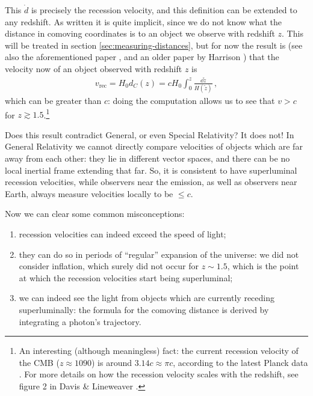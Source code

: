 \documentclass[main.tex]{subfiles}
\begin{document}
This \(\dot{d}\) is precisely the recession velocity, and this definition can be extended to any redshift. As written it is quite implicit, since we do not know what the distance in comoving coordinates is to an object we observe with redshift \(z\). This will be treated in section \ref{sec:measuring-distances}, but for now the result is (see also the aforementioned paper \cite[eq. 1]{davisExpandingConfusionCommon2004}, and an older paper by Harrison \cite[eq. 13]{harrisonRedshiftdistanceVelocitydistanceLaws1993}) that the velocity now of an object observed with redshift \(z\) is
%
\begin{align}
v _{\text{rec}} = H_0 d_C(z) = c H_0  \int_{0}^{z} \frac{ \dd{\widetilde{z}}}{H(\widetilde{z})}
\,,
\end{align}
%
which can be greater than \(c\): doing the computation allows us to see that \(v>c\) for \(z \gtrsim 1.5\).\footnote{An interesting (although meaningless) fact: the current recession velocity of the CMB (\(z \approx 1090\)) is around \(\num{3.14} c \approx \pi c\), according to the latest Planck data \cite[]{adePlanck2015Results2016}. For more details on how the recession velocity scales with the redshift, see figure 2 in Davis \& Lineweaver \cite[]{davisExpandingConfusionCommon2004}.} 

Does this result contradict General, or even Special Relativity? 
It does not!
In General Relativity we cannot directly compare velocities of objects which are far away from each other: they lie in different vector spaces, and there can be no local inertial frame extending that far.
So, it is consistent to have superluminal recession velocities, while observers near the emission, as well as observers near Earth, always measure velocities locally to be \(\leq c\). 

Now we can clear some common misconceptions: 
\begin{enumerate}
  \item recession velocities can indeed exceed the speed of light;
  \item they can do so in periods of ``regular'' expansion of the universe: we did not consider inflation, which surely did not occur for \(z \sim 1.5\), which is the point at which the recession velocities start being superluminal;
  \item we can indeed see the light from objects which are currently receding superluminally: the formula for the comoving distance is derived by integrating a photon's trajectory. 
\end{enumerate}
\end{document}
